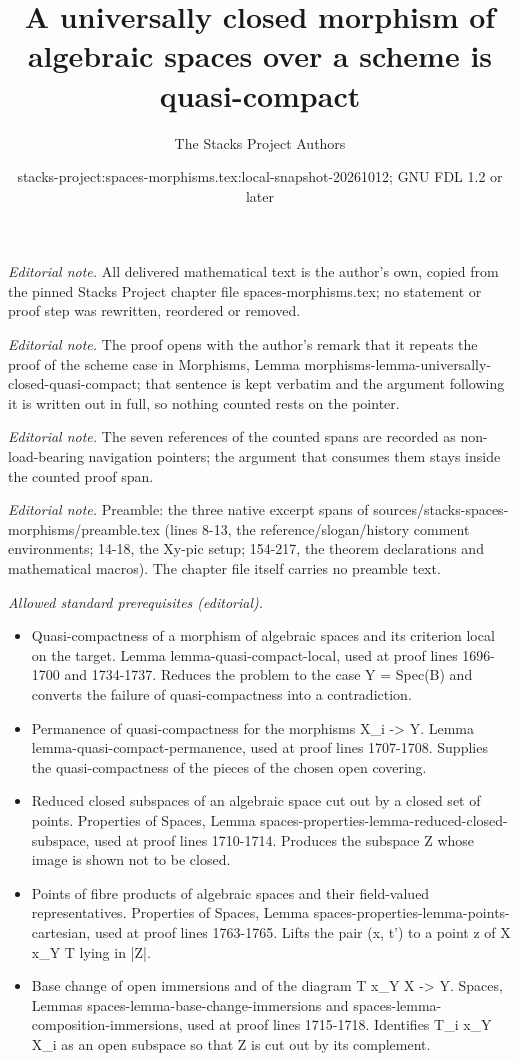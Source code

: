 \documentclass[10pt,a4paper]{amsart}
\title{A universally closed morphism of algebraic spaces over a scheme is quasi-compact}
\author{The Stacks Project Authors}
\date{stacks-project:spaces-morphisms.tex:local-snapshot-20261012; GNU FDL 1.2 or later}
\theoremstyle{plain}
\theoremstyle{definition}
\theoremstyle{remark}
\numberwithin{equation}{subsection}
\begin{document}
\maketitle
\setcounter{subsection}{1}
\noindent\textit{Editorial note.} All delivered mathematical text is the author's own, copied from the pinned Stacks Project chapter file spaces-morphisms.tex; no statement or proof step was rewritten, reordered or removed.\par\medskip
\noindent\textit{Editorial note.} The proof opens with the author's remark that it repeats the proof of the scheme case in Morphisms, Lemma morphisms-lemma-universally-closed-quasi-compact; that sentence is kept verbatim and the argument following it is written out in full, so nothing counted rests on the pointer.\par\medskip
\noindent\textit{Editorial note.} The seven references of the counted spans are recorded as non-load-bearing navigation pointers; the argument that consumes them stays inside the counted proof span.\par\medskip
\noindent\textit{Editorial note.} Preamble: the three native excerpt spans of sources/stacks-spaces-morphisms/preamble.tex (lines 8-13, the reference/slogan/history comment environments; 14-18, the Xy-pic setup; 154-217, the theorem declarations and mathematical macros). The chapter file itself carries no preamble text.\par\medskip
\noindent\textit{Allowed standard prerequisites (editorial).}\begin{itemize}
\item Quasi-compactness of a morphism of algebraic spaces and its criterion local on the target. Lemma lemma-quasi-compact-local, used at proof lines 1696-1700 and 1734-1737. Reduces the problem to the case Y = Spec(B) and converts the failure of quasi-compactness into a contradiction.
\item Permanence of quasi-compactness for the morphisms X\_i -> Y. Lemma lemma-quasi-compact-permanence, used at proof lines 1707-1708. Supplies the quasi-compactness of the pieces of the chosen open covering.
\item Reduced closed subspaces of an algebraic space cut out by a closed set of points. Properties of Spaces, Lemma spaces-properties-lemma-reduced-closed-subspace, used at proof lines 1710-1714. Produces the subspace Z whose image is shown not to be closed.
\item Points of fibre products of algebraic spaces and their field-valued representatives. Properties of Spaces, Lemma spaces-properties-lemma-points-cartesian, used at proof lines 1763-1765. Lifts the pair (x, t') to a point z of X x\_Y T lying in |Z|.
\item Base change of open immersions and of the diagram T x\_Y X -> Y. Spaces, Lemmas spaces-lemma-base-change-immersions and spaces-lemma-composition-immersions, used at proof lines 1715-1718. Identifies T\_i x\_Y X\_i as an open subspace so that Z is cut out by its complement.
\end{itemize}\medskip
\end{document}
